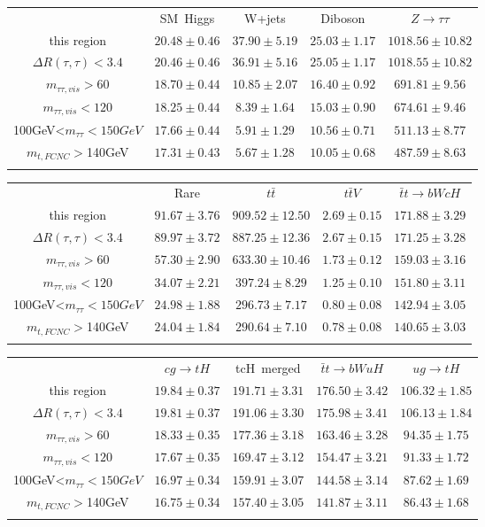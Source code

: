 \centering
\begin{tabular}{ccccc} \toprule\toprule
 & SM~Higgs & W+jets & Diboson & $Z\to \tau\tau$\\
 this region & $20.48\pm0.46$ & $37.90\pm5.19$ & $25.03\pm1.17$ & $1018.56\pm10.82$\\
$\Delta R(\tau,\tau)<3.4$ & $20.46\pm0.46$ & $36.91\pm5.16$ & $25.05\pm1.17$ & $1018.55\pm10.82$\\
$m_{\tau\tau,vis}>60$ & $18.70\pm0.44$ & $10.85\pm2.07$ & $16.40\pm0.92$ & $691.81\pm9.56$\\
$m_{\tau\tau,vis}<120$ & $18.25\pm0.44$ & $8.39\pm1.64$ & $15.03\pm0.90$ & $674.61\pm9.46$\\
100GeV<$m_{\tau\tau}<150GeV$ & $17.66\pm0.44$ & $5.91\pm1.29$ & $10.56\pm0.71$ & $511.13\pm8.77$\\
$m_{t,FCNC}>$140GeV & $17.31\pm0.43$ & $5.67\pm1.28$ & $10.05\pm0.68$ & $487.59\pm8.63$\\
\bottomrule\bottomrule\\
\end{tabular}
\begin{tabular}{ccccc} \toprule\toprule
 & Rare & $t\bar{t}$ & $t\bar{t}V$ & $\bar{t}t\to bWcH$\\
 this region & $91.67\pm3.76$ & $909.52\pm12.50$ & $2.69\pm0.15$ & $171.88\pm3.29$\\
$\Delta R(\tau,\tau)<3.4$ & $89.97\pm3.72$ & $887.25\pm12.36$ & $2.67\pm0.15$ & $171.25\pm3.28$\\
$m_{\tau\tau,vis}>60$ & $57.30\pm2.90$ & $633.30\pm10.46$ & $1.73\pm0.12$ & $159.03\pm3.16$\\
$m_{\tau\tau,vis}<120$ & $34.07\pm2.21$ & $397.24\pm8.29$ & $1.25\pm0.10$ & $151.80\pm3.11$\\
100GeV<$m_{\tau\tau}<150GeV$ & $24.98\pm1.88$ & $296.73\pm7.17$ & $0.80\pm0.08$ & $142.94\pm3.05$\\
$m_{t,FCNC}>$140GeV & $24.04\pm1.84$ & $290.64\pm7.10$ & $0.78\pm0.08$ & $140.65\pm3.03$\\
\bottomrule\bottomrule\\
\end{tabular}
\begin{tabular}{ccccc} \toprule\toprule
 & $cg\to tH$ & tcH~merged & $\bar{t}t\to bWuH$ & $ug\to tH$\\
 this region & $19.84\pm0.37$ & $191.71\pm3.31$ & $176.50\pm3.42$ & $106.32\pm1.85$\\
$\Delta R(\tau,\tau)<3.4$ & $19.81\pm0.37$ & $191.06\pm3.30$ & $175.98\pm3.41$ & $106.13\pm1.84$\\
$m_{\tau\tau,vis}>60$ & $18.33\pm0.35$ & $177.36\pm3.18$ & $163.46\pm3.28$ & $94.35\pm1.75$\\
$m_{\tau\tau,vis}<120$ & $17.67\pm0.35$ & $169.47\pm3.12$ & $154.47\pm3.21$ & $91.33\pm1.72$\\
100GeV<$m_{\tau\tau}<150GeV$ & $16.97\pm0.34$ & $159.91\pm3.07$ & $144.58\pm3.14$ & $87.62\pm1.69$\\
$m_{t,FCNC}>$140GeV & $16.75\pm0.34$ & $157.40\pm3.05$ & $141.87\pm3.11$ & $86.43\pm1.68$\\
\bottomrule\bottomrule\\
\end{tabular}
